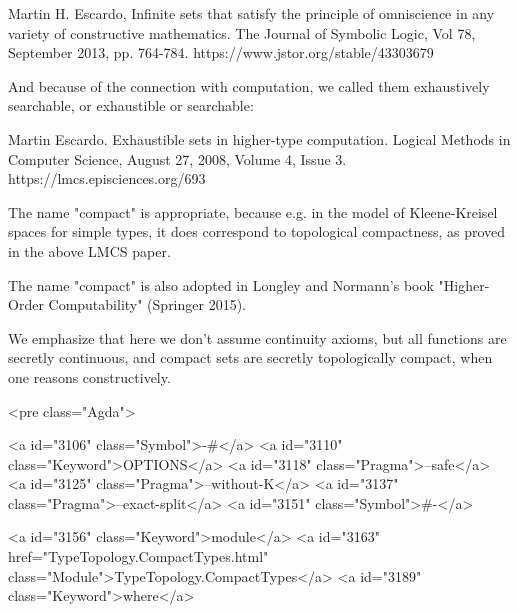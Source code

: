    Martin H. Escardo, Infinite sets that satisfy the principle of
   omniscience in any variety of constructive mathematics. The Journal
   of Symbolic Logic, Vol 78, September 2013, pp. 764-784.
   https://www.jstor.org/stable/43303679

And because of the connection with computation, we called them
exhaustively searchable, or exhaustible or searchable:

   Martin Escardo. Exhaustible sets in higher-type computation. Logical
   Methods in Computer Science, August 27, 2008, Volume 4, Issue 3.
   https://lmcs.episciences.org/693

The name "compact" is appropriate, because e.g. in the model of
Kleene-Kreisel spaces for simple types, it does correspond to
topological compactness, as proved in the above LMCS paper.

The name "compact" is also adopted in Longley and Normann's book
"Higher-Order Computability" (Springer 2015).

We emphasize that here we don't assume continuity axioms, but all
functions are secretly continuous, and compact sets are secretly
topologically compact, when one reasons constructively.

<pre class="Agda">

<a id="3106" class="Symbol">{-#</a> <a id="3110" class="Keyword">OPTIONS</a> <a id="3118" class="Pragma">--safe</a> <a id="3125" class="Pragma">--without-K</a> <a id="3137" class="Pragma">--exact-split</a> <a id="3151" class="Symbol">#-}</a>

<a id="3156" class="Keyword">module</a> <a id="3163" href="TypeTopology.CompactTypes.html" class="Module">TypeTopology.CompactTypes</a> <a id="3189" class="Keyword">where</a>

